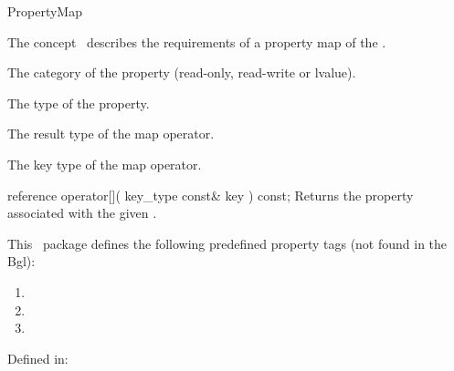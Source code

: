 
\begin{ccRefConcept}{PropertyMap}


\ccDefinition

The concept \ccRefName\ describes the requirements of a property map of the 
.

\ccTypes
   {The category of the property (read-only, read-write or lvalue).}{}
  
   {The type of the property.}{}
    
   {The result type of the map operator.}{}
    
   {The key type of the map operator.}{}


\ccOperations

\ccMethod
  {reference operator[]( key_type const& key ) const;}
  {Returns the property associated with the given .}  

This \cgal\ package defines the following predefined property tags (not found in the {\sc Bgl}):


\begin{enumerate}
\item {}
\item {}
\item {}
\end{enumerate}

Defined in:
  

\ccHasModels
{}\\
\\
\\
\\
\\

\end{ccRefConcept}




